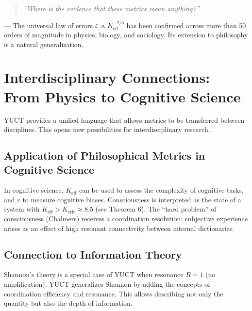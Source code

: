 \documentclass[12pt,a4paper]{article}
\newcommand{\eps}{\varepsilon}
\begin{document}
	\begin{quote}
		\textit{``Where is the evidence that these metrics mean anything?''}
	\end{quote}
	— The universal law of errors \(\eps \propto K_{\mathrm{eff}}^{-2/3}\) has been confirmed across more than 50 orders of magnitude in physics, biology, and sociology. Its extension to philosophy is a natural generalization.
	
	\section{Interdisciplinary Connections: From Physics to Cognitive Science}
	\label{sec:interdisciplinary}
	
	YUCT provides a unified language that allows metrics to be transferred between disciplines. This opens new possibilities for interdisciplinary research.
	
	\subsection{Application of Philosophical Metrics in Cognitive Science}
	
	In cognitive science, \(K_{\mathrm{eff}}\) can be used to assess the complexity of cognitive tasks, and \(\eps\) to measure cognitive biases. Consciousness is interpreted as the state of a system with \(K_{\mathrm{eff}} > K_{\mathrm{crit}} \approx 8.5\) (see Theorem 6). The ``hard problem'' of consciousness (Chalmers) receives a coordination resolution: subjective experience arises as an effect of high resonant connectivity between internal dictionaries.
	
	\subsection{Connection to Information Theory}
	
	Shannon's theory is a special case of YUCT when resonance \(R = 1\) (no amplification). YUCT generalizes Shannon by adding the concepts of coordination efficiency and resonance. This allows describing not only the quantity but also the depth of information.
	
\end{document}
